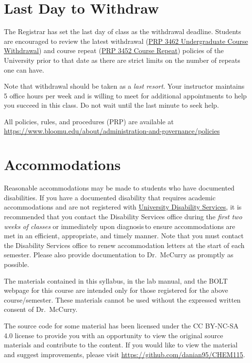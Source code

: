 \documentclass[11pt,letterpaper]{article}
\begin{document}
\section{Last Day to Withdraw}
The Registrar has set the last day of class as the withdrawal deadline.
Students are encouraged to review the latest withdrawal
(\href{https://www.bloomu.edu/prp-3462-undergraduate-course-withdrawal}{PRP 3462 Undergraduate
Course Withdrawal}) and course repeat
(\href{https://www.bloomu.edu/prp-3452-course-repeat}{PRP 3452 Course
Repeat}) policies of the
University prior to that date as there are strict limits on the number of
repeats one can have. 

Note that withdrawal should be taken as a \emph{last resort}. Your instructor
maintains 5 office hours per week and is willing to meet for additional
appointments to help you succeed in this class. Do not wait until the last minute to seek help.

\begin{mdframed}
	\centering
	All policies, rules, and procedures (PRP) are available at
	\url{https://www.bloomu.edu/about/administration-and-governance/policies}
\end{mdframed}

\section{Accommodations}
Reasonable accommodations may be made to students who have documented
disabilities. If you have a documented disability that requires academic
accommodations and are not registered with
\href{https://bloomu.prod.acquia-sites.com/offices-directory/disability-services}{University
Disability Services}, it is recommended that you contact the Disability Services office during
the \textit{first two weeks of classes} or immediately upon diagnosis to ensure
accommodations are met in an efficient, appropriate, and timely manner.
Note that you must contact the Disability Services office to renew accommodation
letters at the start of each semester. Please also provide documentation to Dr.\
McCurry as promptly as possible.

\vfill

\begin{mdframed}
	\noindent
	The materials contained in this syllabus, in the lab manual, and the
	BOLT webpage for this course are intended only for those registered for
	the above course/semester. These materials cannot be used without the
	expressed written consent of Dr.\ McCurry.

	\bigskip

	\noindent
	The source code for some material has been licensed under the CC
	BY-NC-SA 4.0 license to provide you with an opportunity to view the
	original source materials and contribute to the content. If you would
	like to view the material and suggest improvements, please visit
	\url{https://github.com/danian95/CHEM115}.
\end{mdframed}
\end{document}
